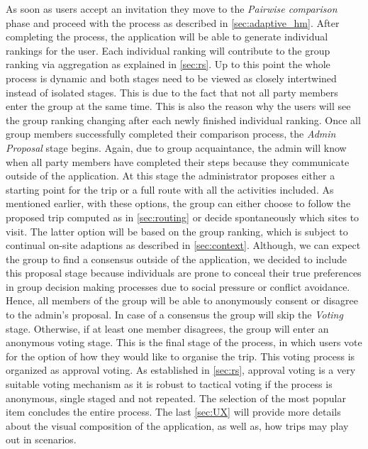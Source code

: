 \documentclass[11pt,a4paper,oneside]{article}
\begin{document}
As soon as users accept an invitation they move to the \emph{Pairwise comparison} phase and proceed with the process as described in \autoref{sec:adaptive_hm}. After completing the process, the application will be able to generate individual rankings for the user. Each individual ranking will contribute to the group ranking via aggregation as explained in \autoref{sec:rs}. Up to this point the whole process is dynamic and both stages need to be viewed as closely intertwined instead of isolated stages. This is due to the fact that not all party members enter the group at the same time. This is also the reason why the users will see the group ranking changing after each newly finished individual ranking. Once all group members successfully completed their comparison process, the \emph{Admin Proposal} stage begins. Again, due to group acquaintance, the admin will know when all party members have completed their steps because they communicate outside of the application. At this stage the administrator proposes either a starting point for the trip or a full route with all the activities included. As mentioned earlier, with these options, the group can either choose to follow the proposed trip computed as in \autoref{sec:routing} or decide spontaneously which sites to visit. The latter option will be based on the group ranking, which is subject to continual on-site adaptions as described in \autoref{sec:context}. Although, we can expect the group to find a consensus outside of the application, we decided to include this proposal stage because individuals are prone to conceal their true preferences in group decision making processes due to social pressure or conflict avoidance. Hence, all members of the group will be able to anonymously consent or disagree to the admin's proposal. In case of a consensus the group will skip the \emph{Voting} stage. Otherwise, if at least one member disagrees, the group will enter an anonymous voting stage. This is the final stage of the process, in which users vote for the option of how they would like to organise the trip. This voting process is organized as approval voting. As established in \autoref{sec:rs}, approval voting is a very suitable voting mechanism as it is robust to tactical voting if the process is anonymous, single staged and not repeated. The selection of the most popular item concludes the entire process. The last \autoref{sec:UX} will provide more details about the visual composition of the application, as well as, how trips may play out in scenarios.  
\end{document}
